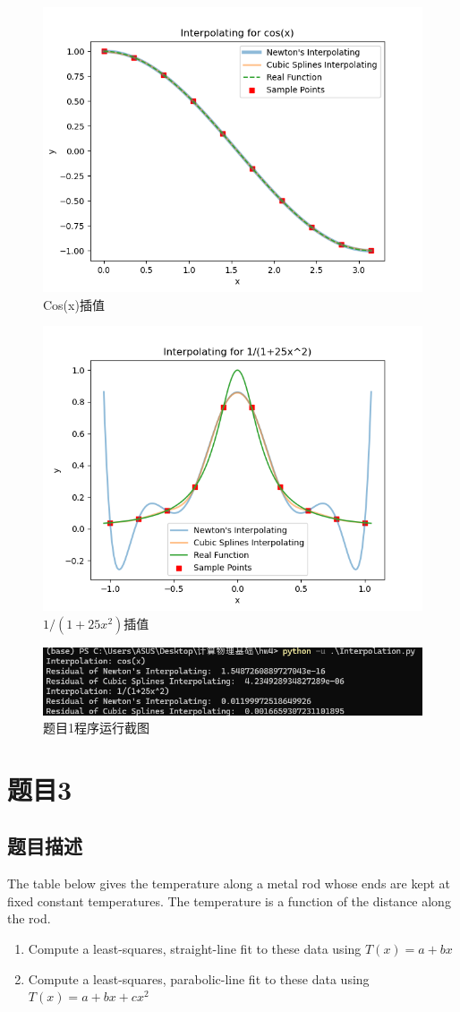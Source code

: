 \documentclass[11pt]{article}
\begin{document}
  \begin{figure}[ht]
    \centering
    \includegraphics[width=0.6\linewidth]{photo/Interpolation1.png}
    \caption{Cos(x)插值}
    \label{fig:1}
  \end{figure}

  \begin{figure}[ht]
    \centering
    \includegraphics[width=0.6\linewidth]{photo/Interpolation2.png}
    \caption{$1/(1+25x^2)$插值}
    \label{fig:2}
  \end{figure}
  \begin{figure}[ht]
    \centering
    \includegraphics[width=0.6\linewidth]{photo/fig1.png}
    \caption{题目1程序运行截图}
    \label{fig:3}
  \end{figure}

  \section{题目3}
  \subsection{题目描述}
  The table below gives the temperature 
 along a metal rod whose ends are kept at fixed constant temperatures. The temperature is a function of the distance 
 along the rod.
 \begin{enumerate}
  \item Compute a least-squares, straight-line fit to these data using $T(x)=a+bx$
  \item Compute a least-squares, parabolic-line fit to these data using $T(x)=a+bx+cx^2$
\end{enumerate}
\end{document}
